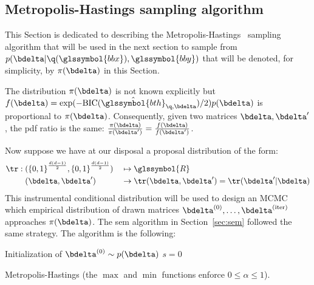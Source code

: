 \subsection{Metropolis-Hastings sampling algorithm}

This Section is dedicated to describing the Metropolis-Hastings~\cite{hastings1970monte} sampling algorithm that will be used in the next section to sample from $p(\bdelta | \q(\glssymbol{bbx}),\glssymbol{bby})$ that will be denoted, for simplicity, by $\pi(\bdelta)$ in this Section.

The distribution $\pi(\bdelta)$ is not known explicitly but $f(\bdelta) = \exp(-\text{BIC}(\hat{\glssymbol{bth}}_{\q,\bdelta})/2) p(\bdelta)$ is proportional to $\pi(\bdelta)$. Consequently, given two matrices $\bdelta,\bdelta'$, the \gls{pdf} ratio is the same: $\frac{\pi(\bdelta)}{\pi(\bdelta')} = \frac{f(\bdelta)}{f(\bdelta')}$.

Now suppose we have at our disposal a proposal distribution of the form:
\begin{alignat}{2}
\tr: \; & ({\{0,1\}}^{\frac{d(d-1)}{2}},{\{0,1\}}^{\frac{d(d-1)}{2}}) && \mapsto \glssymbol{R} \nonumber \\ 
& (\bdelta,\bdelta') && \to \tr(\bdelta,\bdelta') = \tr(\bdelta' | \bdelta) \nonumber
\end{alignat}
This instrumental conditional distribution will be used to design an MCMC which empirical distribution of drawn matrices $\bdelta^{(0)}, \dots, \bdelta^{(\text{iter})}$ approaches $\pi(\bdelta)$. The \gls{sem} algorithm in Section~\ref{sec:sem} followed the same strategy. The algorithm is the following:

\begin{algorithm}[H]
 Initialization of $ \bdelta^{(0)} \sim p(\bdelta)$\;
 $s = 0$\;
\caption{\label{metropolis} Metropolis-Hastings (the $\max$ and $\min$ functions enforce $0 \leq \alpha \leq 1$).}
\label{alg:metro}
\end{algorithm}

